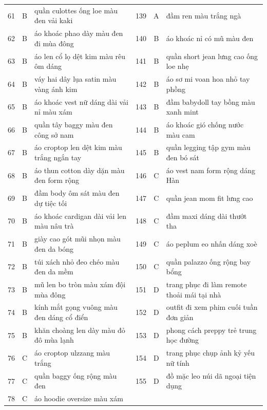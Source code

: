 \begin{longtable}{@{}r c p{5.7cm} r c p{5.7cm}@{}}
61 & B & quần culottes ống loe màu đen vải kaki & 139 & A & đầm ren màu trắng ngà \\
62 & B & áo khoác phao dày màu đen đi mùa đông & 140 & B & áo khoác nỉ có mũ màu đen \\
63 & B & áo len cổ lọ dệt kim màu rêu ôm dáng & 141 & B & quần short jean lưng cao ống loe nhẹ \\
64 & B & váy hai dây lụa satin màu vàng ánh kim & 142 & B & áo sơ mi voan hoa nhỏ tay phồng \\
65 & B & áo khoác vest nữ dáng dài vải nỉ màu xám & 143 & B & đầm babydoll tay bồng màu xanh mint \\
66 & B & quần tây baggy màu đen công sở nam & 144 & B & áo khoác gió chống nước màu cam \\
67 & B & áo croptop len dệt kim màu trắng ngắn tay & 145 & B & quần legging tập gym màu đen bó sát \\
68 & B & áo thun cotton dày dặn màu đen form rộng & 146 & C & áo vest nam form rộng dáng Hàn \\
69 & B & đầm body ôm sát màu đen dự tiệc tối & 147 & C & quần jean mom fit lưng cao \\
70 & B & áo khoác cardigan dài vải len màu nâu trà & 148 & C & đầm maxi dáng dài thướt tha \\
71 & B & giày cao gót mũi nhọn màu đen da bóng & 149 & C & áo peplum eo nhấn dáng xoè \\
72 & B & túi xách nhỏ đeo chéo màu đen da mềm & 150 & C & quần palazzo ống rộng bay bổng \\
73 & B & mũ len bo tròn màu xám đội mùa đông & 151 & D & trang phục đi làm remote thoải mái tại nhà \\
74 & B & kính mắt gọng vuông màu đen dáng cổ điển & 152 & D & outfit đi xem phim cuối tuần đơn giản \\
75 & B & khăn choàng len dày màu đỏ đô mùa lạnh & 153 & D & phong cách preppy trẻ trung học đường \\
76 & C & áo croptop ulzzang màu trắng & 154 & D & trang phục chụp ảnh kỷ yếu nữ tính \\
77 & C & quần baggy ống rộng màu đen & 155 & D & đồ mặc leo núi dã ngoại tiện dụng \\
78 & C & áo hoodie oversize màu xám &  &  &  \\
\end{longtable}
\endgroup
